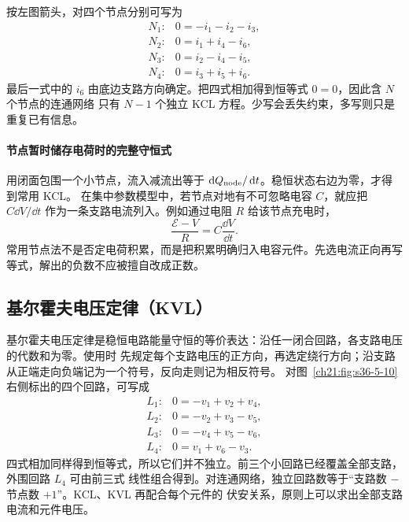 {\par\noindent\begin{minipage}{\linewidth}
\kclKvlFigure
{}
\end{minipage}\par\medskip

按左图箭头，对四个节点分别可写为
\[
\begin{array}{ll}
N_1:&0=-i_1-i_2-i_3,\\
N_2:&0=i_1+i_4-i_6,\\
N_3:&0=i_2-i_4-i_5,\\
N_4:&0=i_3+i_5+i_6.
\end{array}
\]
最后一式中的 $i_6$ 由底边支路方向确定。把四式相加得到恒等式 $0=0$，因此含 $N$ 个节点的连通网络
只有 $N-1$ 个独立 KCL 方程。少写会丢失约束，多写则只是重复已有信息。


\paragraph{节点暂时储存电荷时的完整守恒式}
用闭面包围一个小节点，流入减流出等于 $\mathop{}\!\mathrm d Q_{\rm node}/\mathop{}\!\mathrm d t$。稳恒状态右边为零，才得到常用 KCL。
在集中参数模型中，若节点对地有不可忽略电容 $C$，就应把 $C\dd V/\dd t$ 作为一条支路电流列入。例如通过电阻 $R$ 给该节点充电时，
\[
 \frac{\mathcal E-V}{R}=C\frac{\dd V}{\dd t}.
\]
常用节点法不是否定电荷积累，而是把积累明确归入电容元件。先选电流正向再写等式，解出的负数不应被擅自改成正数。


\subsection{基尔霍夫电压定律（KVL）}


基尔霍夫电压定律是稳恒电路能量守恒的等价表达：沿任一闭合回路，各支路电压的代数和为零。使用时
先规定每个支路电压的正方向，再选定绕行方向；沿支路从正端走向负端记为一个符号，反向走则记为相反符号。
对图~\ref{ch21:fig:s36-5-10} 右侧标出的四个回路，可写成
\[
\begin{array}{ll}
L_1:&0=-v_1+v_2+v_4,\\
L_2:&0=-v_2+v_3-v_5,\\
L_3:&0=-v_4+v_5-v_6,\\
L_4:&0=v_1+v_6-v_3.
\end{array}
\]
四式相加同样得到恒等式，所以它们并不独立。前三个小回路已经覆盖全部支路，外围回路 $L_4$ 可由前三式
线性组合得到。对连通网络，独立回路数等于“支路数 $-$ 节点数 $+1$”。KCL、KVL 再配合每个元件的
伏安关系，原则上可以求出全部支路电流和元件电压。


}
